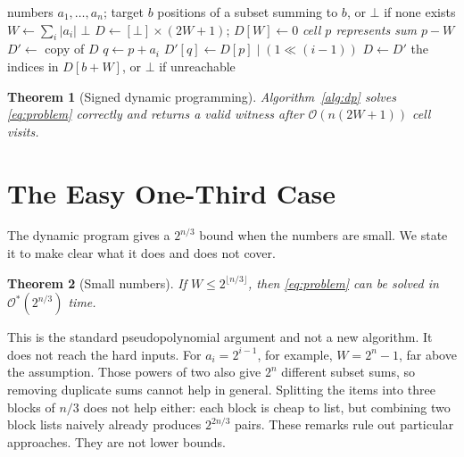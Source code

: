 \documentclass[conference]{IEEEtran}
\newtheorem{theorem}{Theorem}
\newcommand{\Oh}{\mathcal{O}}
\begin{document}
\begin{algorithm}[t]
\caption{Dense signed-sum dynamic programming}
\label{alg:dp}
\begin{algorithmic}[1]
\Require numbers $a_1,\dots,a_n$; target $b$
\Ensure positions of a subset summing to $b$, or $\bot$ if none exists
\State $W \gets \sum_{i}|a_i|$
 \State \Return $\bot$ \EndIf
\State $D \gets [\bot] \times (2W+1)$; \quad $D[W]\gets 0$
\Statex \hspace{\algorithmicindent}\textit{\small cell $p$ represents sum $p-W$}
   \State $D' \gets$ copy of $D$
      \State $q \gets p + a_i$
         \State $D'[q] \gets D[p] \mid (1\ll (i-1))$
      \EndIf
   \EndFor
   \State $D \gets D'$
\EndFor
\State \Return the indices in $D[b+W]$, or $\bot$ if unreachable
\end{algorithmic}
\end{algorithm}

\begin{theorem}[Signed dynamic programming]\label{thm:dp}
Algorithm~\ref{alg:dp} solves \eqref{eq:problem} correctly and returns a valid
witness after $\Oh(n(2W+1))$ cell visits.
\end{theorem}

\section{The Easy One-Third Case}
The dynamic program gives a $2^{n/3}$ bound when the numbers are small. We
state it to make clear what it does and does not cover.
\begin{theorem}[Small numbers]\label{thm:restricted}
If $W\le 2^{\lfloor n/3\rfloor}$, then \eqref{eq:problem} can be solved in
$\Oh^*(2^{n/3})$ time.
\end{theorem}

This is the standard pseudopolynomial argument and not a new algorithm. It
does not reach the hard inputs. For $a_i=2^{i-1}$, for example, $W=2^n-1$, far
above the assumption. Those powers of two also give $2^n$ different subset
sums, so removing duplicate sums cannot help in general. Splitting the items
into three blocks of $n/3$ does not help either: each block is cheap to list,
but combining two block lists naively already produces $2^{2n/3}$ pairs. These
remarks rule out particular approaches. They are not lower bounds.
\end{document}

